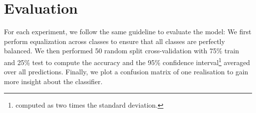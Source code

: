 \section{Evaluation}
\label{evaluation}

For each experiment, we follow the same guideline to evaluate the model: We first perform equalization across classes to ensure that all classes are perfectly balanced. We then performed 50 random split cross-validation with 75\% train and 25\% test to compute the accuracy and the 95\% confidence interval\footnote{computed as two times the standard deviation.} averaged over all predictions. Finally, we plot a confusion matrix of one realisation to gain more insight about the classifier.
